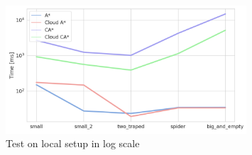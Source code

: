 \begin{figure}[H]
    \centering
    \includegraphics[width=0.8\textwidth]{pictures/local_test_log.png}
    \caption{Test on local setup in log scale}
    \label{fig:local_test_log}
\end{figure}